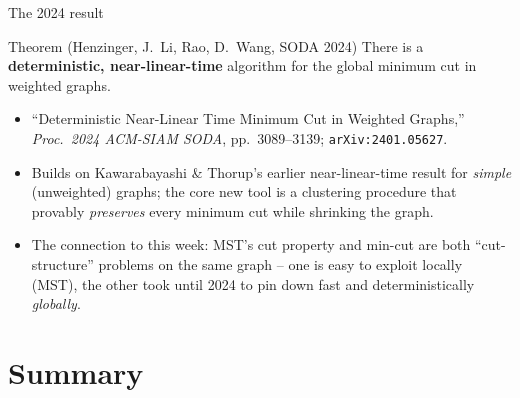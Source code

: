 \documentclass[11pt,aspectratio=169]{beamer}
\begin{document}
\begin{frame}{The 2024 result}
  \begin{block}{Theorem (Henzinger, J.~Li, Rao, D.~Wang, SODA 2024)}
    There is a \textbf{deterministic, near-linear-time} algorithm for the global
    minimum cut in weighted graphs.
  \end{block}
  \begin{itemize}
    \item ``Deterministic Near-Linear Time Minimum Cut in Weighted Graphs,''
    \emph{Proc.\ 2024 ACM-SIAM SODA}, pp.\ 3089--3139; \texttt{arXiv:2401.05627}.
    \item Builds on Kawarabayashi \& Thorup's earlier near-linear-time result for
    \emph{simple} (unweighted) graphs; the core new tool is a clustering
    procedure that provably \emph{preserves} every minimum cut while shrinking
    the graph.
    \item The connection to this week: MST's cut property and min-cut are both
    ``cut-structure'' problems on the same graph -- one is easy to exploit
    locally (MST), the other took until 2024 to pin down fast and
    deterministically \emph{globally}.
  \end{itemize}
\end{frame}

\section{Summary}
\end{document}
